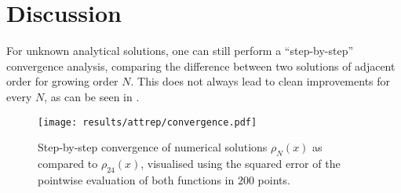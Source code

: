 

\pagebreak


\section{Discussion}
For unknown analytical solutions, one can still perform a ``step-by-step'' convergence analysis, comparing the difference between two solutions of adjacent order for growing order $N$.
This does not always lead to clean improvements for every $N$, as can be seen in .

\begin{figure}[H]
  \centering
  \texttt{[image: results/attrep/convergence.pdf]}
  \caption[Step-by-step convergence of solutions compared to order 24]{Step-by-step convergence of numerical solutions $\rho_N(x)$ as compared to $\rho_{24}(x)$, visualised using the squared error of the pointwise evaluation of both functions in $200$ points.}
  \label{fig:convergence}
\end{figure}
